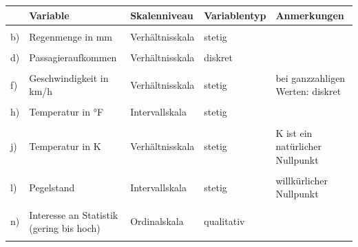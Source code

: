 \documentclass[
  11pt,
  ngerman,
  a4paper,
]{report}
\begin{document}
\begin{table}[H]
\centering
\begin{tabular}{l>{\raggedright\arraybackslash}p{8cm}>{\raggedright\arraybackslash}p{8cm}l>{\raggedright\arraybackslash}p{8cm}}
\toprule
\textbf{ } & \textbf{Variable} & \textbf{Skalenniveau} & \textbf{Variablentyp} & \textbf{Anmerkungen}\\
\midrule
\cellcolor{gray!6}{a)} & \cellcolor{gray!6}{Lebensalter in Jahren} & \cellcolor{gray!6}{Verhältnisskala} & \cellcolor{gray!6}{diskret} & \cellcolor{gray!6}{ganze Zahlen vorausgesetzt}\\
b) & Regenmenge in mm & Verhältnisskala & stetig & \\
\cellcolor{gray!6}{c)} & \cellcolor{gray!6}{Güteklasse} & \cellcolor{gray!6}{Ordinalskala} & \cellcolor{gray!6}{qualitativ} & \cellcolor{gray!6}{}\\
d) & Passagieraufkommen & Verhältnisskala & diskret & \\
\cellcolor{gray!6}{e)} & \cellcolor{gray!6}{Baujahr} & \cellcolor{gray!6}{Intervallskala} & \cellcolor{gray!6}{diskret} & \cellcolor{gray!6}{}\\
f) & Geschwindigkeit in km/h & Verhältnisskala & stetig & bei ganzzahligen Werten: diskret\\
\cellcolor{gray!6}{g)} & \cellcolor{gray!6}{Sozialstatus (Unter-, Mittel und Oberschicht)} & \cellcolor{gray!6}{Ordinalskala} & \cellcolor{gray!6}{qualitativ} & \cellcolor{gray!6}{}\\
h) & Temperatur in °F & Intervallskala & stetig & \\
\cellcolor{gray!6}{i)} & \cellcolor{gray!6}{Fläche eines Bundeslands in km²} & \cellcolor{gray!6}{Verhältnisskala} & \cellcolor{gray!6}{stetig} & \cellcolor{gray!6}{}\\
j) & Temperatur in K & Verhältnisskala & stetig & 0 K ist ein natürlicher Nullpunkt\\
\cellcolor{gray!6}{k)} & \cellcolor{gray!6}{Einwohnerzahl} & \cellcolor{gray!6}{Verhältnisskala} & \cellcolor{gray!6}{diskret} & \cellcolor{gray!6}{}\\
l) & Pegelstand & Intervallskala & stetig & willkürlicher Nullpunkt\\
\cellcolor{gray!6}{m)} & \cellcolor{gray!6}{Staatsangehörigkeit} & \cellcolor{gray!6}{Nominalskala} & \cellcolor{gray!6}{qualitativ} & \cellcolor{gray!6}{}\\
n) & Interesse an Statistik (gering bis hoch) & Ordinalskala & qualitativ & \\
\cellcolor{gray!6}{o)} & \cellcolor{gray!6}{Klausurnote} & \cellcolor{gray!6}{Ordinalskala (Intervall- auch vertretbar)} & \cellcolor{gray!6}{qualitativ} & \cellcolor{gray!6}{wird jedoch oft metrisch verwendet}\\

\end{tabular}
\end{table}
\end{document}
